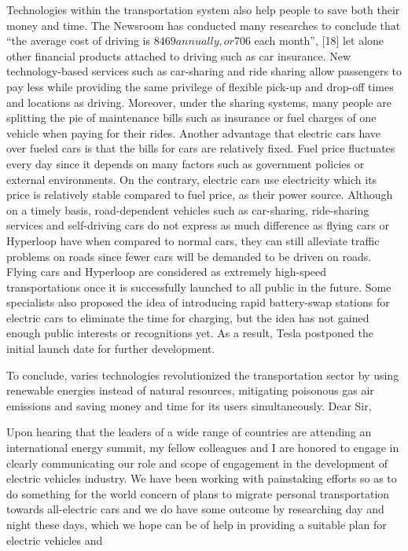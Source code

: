 \documentclass{mcmthesis}
\begin{document}
	Technologies within the transportation system also help people to save both their money and time. The Newsroom has conducted many researches to conclude that “the average cost of driving is $8469 annually, or $706 each month”, [18] let alone other financial products attached to driving such as car insurance. New technology-based services such as car-sharing and ride sharing allow passengers to pay less while providing the same privilege of flexible pick-up and drop-off times and locations as driving. Moreover, under the sharing systems, many people are splitting the pie of maintenance bills such as insurance or fuel charges of one vehicle when paying for their rides. Another advantage that electric cars have over fueled cars is that the bills for cars are relatively fixed. Fuel price fluctuates every day since it depends on many factors such as government policies or external environments. On the contrary, electric cars use electricity which its price is relatively stable compared to fuel price, as their power source. Although on a timely basis, road-dependent vehicles such as car-sharing, ride-sharing services and self-driving cars do not express as much difference as flying cars or Hyperloop have when compared to normal cars, they can still alleviate traffic problems on roads since fewer cars will be demanded to be driven on roads. Flying cars and Hyperloop are considered as extremely high-speed transportations once it is successfully launched to all public in the future. Some specialists also proposed the idea of introducing rapid battery-swap stations for electric cars to eliminate the time for charging, but the idea has not gained enough public interests or recognitions yet. As a result, Tesla postponed the initial launch date for further development.
	\par
	To conclude, varies technologies revolutionized the transportation sector by using renewable energies instead of natural resources, mitigating poisonous gas air emissions and saving money and time for its users simultaneously.
	\newpage
	Dear Sir,
	\par
	Upon hearing that the leaders of a wide range of countries are attending an international energy summit,  my fellow colleagues and I are honored to engage in clearly communicating our role and scope of engagement in the development of electric vehicles industry.  We have been working with painstaking efforts so as to do something for the world concern of plans to migrate personal transportation towards all-electric cars and we do have some outcome by researching day and night these days, which we hope can be of help in providing a suitable plan for electric vehicles and 
\end{document}
